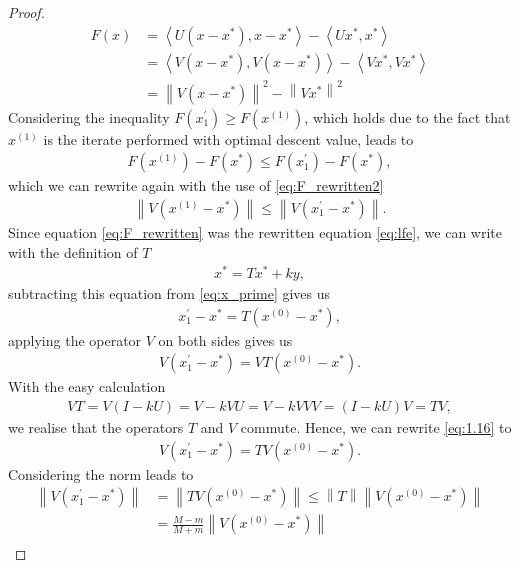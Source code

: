\begin{proof}
\begin{align}
F(x) &= \left\langle U(x - x^{\ast}), x - x^{\ast} \right\rangle - \left\langle Ux^{\ast}, x^{\ast} \right\rangle\nonumber\\
&= \left\langle V(x - x^{\ast}), V(x - x^{\ast}) \right\rangle - \left\langle Vx^{\ast}, Vx^{\ast} \right\rangle\nonumber\\
&= \left\|V(x - x^{\ast}) \right\|^2 - \left\|Vx^{\ast} \right\|^2
\end{align}
Considering the inequality $F(x^{\prime}_1) \geq F(x^{(1)})$, which holds due to the fact that $x^{(1)}$ is the iterate performed with optimal descent value, leads to
\begin{align*}
F(x^{(1)}) -F(x^{\ast}) \leq F(x^{\prime}_1) -F(x^{\ast}),
\end{align*}
which we can rewrite again with the use of \eqref{eq:F_rewritten2}
\begin{align}\label{ineq:1}
\left\| V(x^{(1)} - x^{\ast}) \right\| \leq \left\| V(x^{\prime}_1 - x^{\ast}) \right\|.
\end{align}
Since equation \eqref{eq:F_rewritten} was the rewritten equation \eqref{eq:lfe}, we can write with the definition of $T$
\begin{align*}
x^{\ast} = Tx^{\ast} + ky,
\end{align*}
subtracting this equation from \eqref{eq:x_prime} gives us
\begin{align*}
x^{\prime}_1 - x^{\ast} = T(x^{(0)} - x^{\ast}),
\end{align*}
applying the operator $V$ on both sides gives us
\begin{align}\label{eq:1.16}
V\left(x^{\prime}_1 - x^{\ast}\right) = VT(x^{(0)} - x^{\ast}).
\end{align}
With the easy calculation
\begin{align*}
VT = V\left( I - kU\right) = V -kVU = V - kVVV = \left(I-kU\right)V = TV,
\end{align*}
we realise that the operators $T$ and $V$ commute. Hence, we can rewrite \eqref{eq:1.16} to
\begin{align*}
V\left(x^{\prime}_1 - x^{\ast}\right) = TV(x^{(0)} - x^{\ast}).
\end{align*}
Considering the norm leads to
\begin{align*}
\left\|V\left(x^{\prime}_1 - x^{\ast}\right)\right\| &= \left\| TV(x^{(0)} - x^{\ast})\right\| \leq \left\| T \right\| \left\|V(x^{(0)} - x^{\ast})\right\|\\
&=\frac{M-m}{M+m} \left\|V(x^{(0)} - x^{\ast})\right\|\\

\end{align*}
\end{proof}
